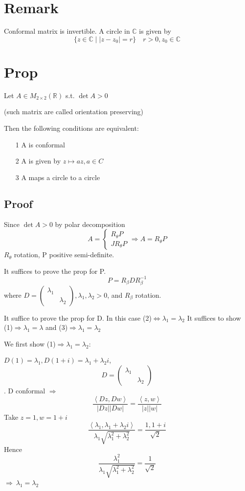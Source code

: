 \documentclass{book}
\newcommand{\abs}[1]{\left\lvert #1 \right\rvert}
\newcommand{\inprod}[2]{\left<#1,#2\right>}
\begin{document}
\section{Remark}Conformal matrix is invertible. A circle in $\mathbb C$ is given by $$\{z\in \mathbb C\mid \abs{z-z_0}=r\}\quad r>0,z_0\in \mathbb C$$
\section{Prop}Let $A\in M_{2\times 2}(\mathbb R)$ s.t. $\det A>0$

(such matrix are called orientation preserving)

Then the following conditions are equivalent:
\begin{itemize}
    \item [1]A is conformal
    \item [2]A is given by $z\mapsto az, a\in C$
    \item [3]A maps a circle to a circle
\end{itemize}
\subsection*{Proof}
Since $\det A>0$ by polar decomposition$$A=\begin{cases}
    R_\theta P\\JR_\theta P
\end{cases}\Rightarrow A=R_\theta P$$
$R_\theta$ rotation, P positive semi-definite.

It suffices to prove the prop for P.
$$P=R_\beta DR_\beta^{-1}$$ where $D=\begin{pmatrix}
    \lambda_1&\\ &\lambda_2
\end{pmatrix},\lambda_1,\lambda_2>0$, and $R_\beta$ rotation.

It suffice to prove the prop for D. In this case (2)$\Leftrightarrow\lambda_1=\lambda_2$ It suffices to show (1)$\Rightarrow \lambda_1=\lambda$ and (3)$\Rightarrow\lambda_1=\lambda_2$

We first show (1)$\Rightarrow\lambda_1=\lambda_2$:

$D(1)=\lambda_1,D(1+i)=\lambda_1+\lambda_2i$, $$D=\begin{pmatrix}
    \lambda_1&\\ &\lambda_2
\end{pmatrix}$$. D conformal $\Rightarrow$ $$\frac{\inprod{Dz}{Dw}}{\abs{Dz}\abs{Dw}}=\frac{\inprod{z}{w}}{\abs{z}\abs{w}}$$
Take $z=1,w=1+i$
$$\frac{\inprod{\lambda_1}{\lambda_1+\lambda_2i}}{\lambda_1\sqrt{\lambda_1^2+\lambda_2^2}}=\frac{1,1+i}{\sqrt{2}}$$
Hence
$$\frac{\lambda_1^2}{\lambda_1\sqrt{\lambda_1^2+\lambda_2^2}}=\frac{1}{\sqrt 2}$$$\Rightarrow\ \lambda_1=\lambda_2$
\end{document}
